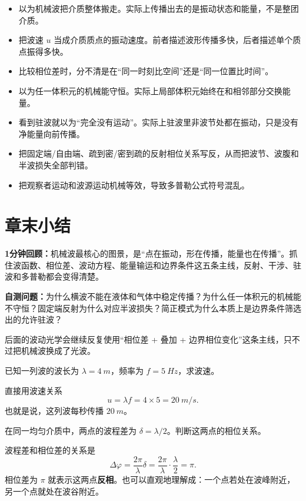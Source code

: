 \documentclass[lang=cn,11pt]{elegantbook}
\newcommand{\bridge}[1]{\begin{note}#1\end{note}}
\newcommand{\summaryline}[1]{\par\noindent\textbf{1分钟回顾：}#1\par}
\newcommand{\chapterselfcheck}[1]{\par\noindent\textbf{自测问题：}#1\par}
\begin{document}
\begin{itemize}
  \item 以为机械波把介质整体搬走。实际上传播出去的是振动状态和能量，不是整团介质。
  \item 把波速 \(u\) 当成介质质点的振动速度。前者描述波形传播多快，后者描述单个质点振得多快。
  \item 比较相位差时，分不清是在“同一时刻比空间”还是“同一位置比时间”。
  \item 以为任一体积元的机械能守恒。实际上局部体积元始终在和相邻部分交换能量。
  \item 看到驻波就以为“完全没有运动”。实际上驻波里非波节处都在振动，只是没有净能量向前传播。
  \item 把固定端/自由端、疏到密/密到疏的反射相位关系写反，从而把波节、波腹和半波损失全部判错。
  \item 把观察者运动和波源运动机械等效，导致多普勒公式符号混乱。
\end{itemize}

\section{章末小结}

\summaryline{机械波最核心的图景，是“点在振动，形在传播，能量也在传播”。抓住波函数、相位差、波动方程、能量输运和边界条件这五条主线，反射、干涉、驻波和多普勒都会变得清楚。}
\chapterselfcheck{为什么横波不能在液体和气体中稳定传播？为什么任一体积元的机械能不守恒？固定端反射为什么对应半波损失？简正模式为什么本质上是边界条件筛选出的允许驻波？}
\bridge{后面的波动光学会继续反复使用“相位差 + 叠加 + 边界相位变化”这条主线，只不过把机械波换成了光波。}

\begin{exercise}[]
已知一列波的波长为 \(\lambda=\SI{4}{m}\)，频率为 \(f=\SI{5}{Hz}\)，求波速。
\end{exercise}

\begin{solution}
直接用波速关系
\[
u=\lambda f=4\times 5=\SI{20}{m/s}.
\]
也就是说，这列波每秒传播 \(\SI{20}{m}\)。
\end{solution}

\begin{exercise}[]
在同一均匀介质中，两点的波程差为 \(\delta=\lambda/2\)。判断这两点的相位关系。
\end{exercise}

\begin{solution}
波程差和相位差的关系是
\[
\Delta\varphi=\frac{2\pi}{\lambda}\delta
=\frac{2\pi}{\lambda}\cdot \frac{\lambda}{2}
=\pi.
\]
相位差为 \(\pi\) 就表示这两点\textbf{反相}。也可以直观地理解成：一个点若处在波峰附近，另一个点就处在波谷附近。
\end{solution}
\end{document}
